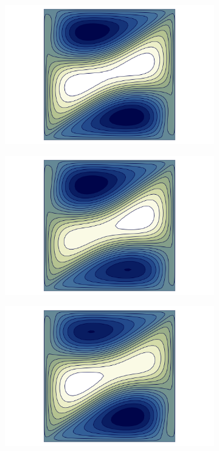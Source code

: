 \begin{figure}[h!]
\begin{subfigure}[b]{0.33\textwidth}
  \centering
  \includegraphics[width=\textwidth]{figs/psi_Re353.356_pf3.png}
\end{subfigure}
\begin{subfigure}[b]{0.33\textwidth}
  \centering
  \includegraphics[width=\textwidth]{figs/psi_Re375.000_branch2_u_t_smaller.png}
\end{subfigure}
\begin{subfigure}[b]{0.33\textwidth}
  \centering
  \includegraphics[width=\textwidth]{figs/psi_Re375.000_branch2_u_t_bigger.png}

\end{subfigure}
\end{figure}
